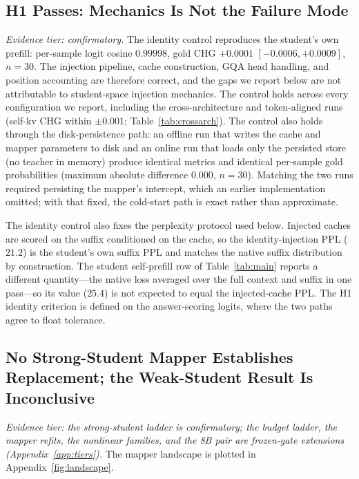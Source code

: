 \documentclass{article} %
\begin{document}
\subsection{H1 Passes: Mechanics Is Not the Failure Mode}
\emph{Evidence tier: confirmatory.} The identity control reproduces the
student's own prefill: per-sample logit cosine $0.99998$, gold CHG $+0.0001$
$[-0.0006, +0.0009]$, $n{=}30$. The injection pipeline, cache construction, GQA
head handling, and position accounting are therefore correct, and the gaps we
report below are not attributable to student-space injection mechanics. The
control holds
across every configuration we report, including the cross-architecture and
token-aligned runs (self-kv CHG within $\pm0.001$; Table~\ref{tab:crossarch}).
The control also holds through the disk-persistence path: an offline run that
writes the cache and mapper parameters to disk and an online run that loads only
the persisted store (no teacher in memory) produce identical metrics and
identical per-sample gold probabilities (maximum absolute difference $0.000$,
$n{=}30$). Matching the two runs required persisting the mapper's intercept,
which an earlier implementation omitted; with that fixed, the cold-start path is
exact rather than approximate.

The identity control also fixes the perplexity protocol used below. Injected
caches are scored on the suffix conditioned on the cache, so the
identity-injection PPL ($21.2$) is the student's own suffix PPL and matches the
native suffix distribution by construction. The student self-prefill row of
Table~\ref{tab:main} reports a different quantity---the native loss averaged
over the full context and suffix in one pass---so its value ($25.4$) is not
expected to equal the injected-cache PPL. The H1 identity criterion is defined
on the answer-scoring logits, where the two paths agree to float tolerance.

\subsection{No Strong-Student Mapper Establishes Replacement; the Weak-Student Result Is Inconclusive}
\emph{Evidence tier: the strong-student ladder is confirmatory; the budget
ladder, the mapper refits, the nonlinear families, and the 8B pair are
frozen-gate extensions (Appendix~\ref{app:tiers}).}
The mapper landscape is plotted in Appendix~\ref{fig:landscape}.
\end{document}
